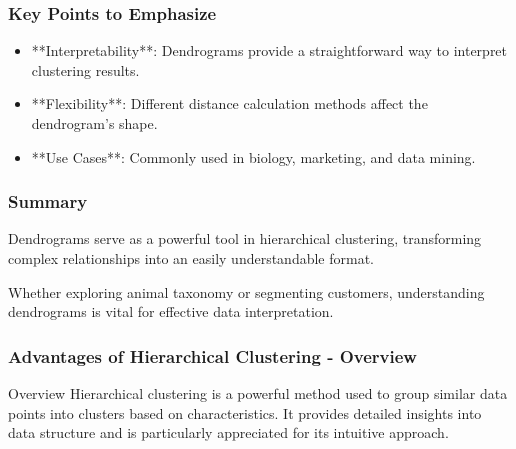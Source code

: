 \documentclass[aspectratio=169]{beamer}
\begin{document}
\begin{frame}[fragile]
    \frametitle{Key Points to Emphasize}
    \begin{itemize}
        \item **Interpretability**: Dendrograms provide a straightforward way to interpret clustering results.
        \item **Flexibility**: Different distance calculation methods affect the dendrogram's shape.
        \item **Use Cases**: Commonly used in biology, marketing, and data mining.
    \end{itemize}
\end{frame}

\begin{frame}[fragile]
    \frametitle{Summary}
    Dendrograms serve as a powerful tool in hierarchical clustering, transforming complex relationships into an easily understandable format. 

    Whether exploring animal taxonomy or segmenting customers, understanding dendrograms is vital for effective data interpretation.
\end{frame}

\begin{frame}[fragile]
    \frametitle{Advantages of Hierarchical Clustering - Overview}
    \begin{block}{Overview}
        Hierarchical clustering is a powerful method used to group similar data points into clusters based on characteristics. 
        It provides detailed insights into data structure and is particularly appreciated for its intuitive approach.
    \end{block}
\end{frame}
\end{document}
